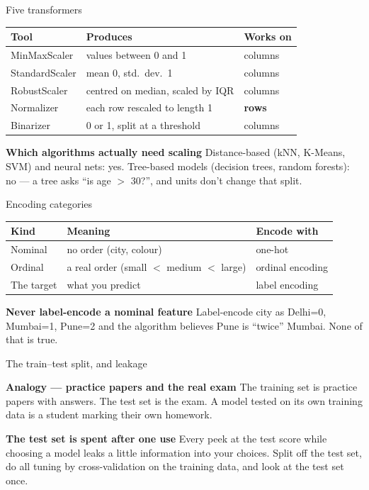 \documentclass[10pt,aspectratio=169]{beamer}
\newcommand{\trapbox}[2]{%
  \begin{alertblock}{\textbf{#1}}
  #2
  \end{alertblock}%
}
\newcommand{\analogybox}[2]{%
  \begin{exampleblock}{\textbf{Analogy --- #1}}
  #2
  \end{exampleblock}%
}
\begin{document}
\begin{frame}{Five transformers}
\begin{table}
\footnotesize
\begin{tabularx}{\linewidth}{@{}lXl@{}}
\toprule
\textbf{Tool} & \textbf{Produces} & \textbf{Works on} \\
\midrule
MinMaxScaler & values between 0 and 1 & columns \\
StandardScaler & mean 0, std.\ dev.\ 1 & columns \\
RobustScaler & centred on median, scaled by IQR & columns \\
Normalizer & each row rescaled to length 1 & \textbf{rows} \\
Binarizer & 0 or 1, split at a threshold & columns \\
\bottomrule
\end{tabularx}
\end{table}
\trapbox{Which algorithms actually need scaling}{Distance-based (kNN, K-Means, SVM) and neural nets: yes. Tree-based models (decision trees, random forests): no --- a tree asks ``is age $>$ 30?'', and units don't change that split.}
\end{frame}

\begin{frame}{Encoding categories}
\begin{table}
\small
\begin{tabularx}{\linewidth}{@{}lXl@{}}
\toprule
\textbf{Kind} & \textbf{Meaning} & \textbf{Encode with} \\
\midrule
Nominal & no order (city, colour) & one-hot \\
Ordinal & a real order (small $<$ medium $<$ large) & ordinal encoding \\
The target & what you predict & label encoding \\
\bottomrule
\end{tabularx}
\end{table}
\trapbox{Never label-encode a nominal feature}{Label-encode city as Delhi=0, Mumbai=1, Pune=2 and the algorithm believes Pune is ``twice'' Mumbai. None of that is true.}
\end{frame}

\begin{frame}{The train--test split, and leakage}
\analogybox{practice papers and the real exam}{The training set is practice papers with answers. The test set is the exam. A model tested on its own training data is a student marking their own homework.}
\vspace{0.2cm}
\trapbox{The test set is spent after one use}{Every peek at the test score while choosing a model leaks a little information into your choices. Split off the test set, do all tuning by cross-validation on the training data, and look at the test set once.}
\end{frame}
\end{document}
